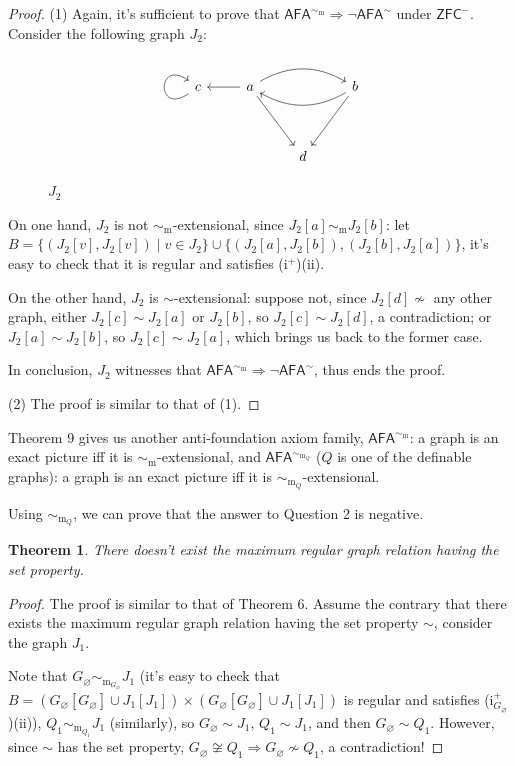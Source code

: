 \documentclass{amsart}
\newcommand{\ZFC}{\mathsf{ZFC}}
\newcommand{\afa}{\mathsf{AFA}}
\newtheorem{theorem}{Theorem}
\begin{document}
\begin{proof}
    (1) Again, it's sufficient to prove that $\afa^{\sim_\mathrm{m}}\Rightarrow\neg\afa^\sim$ under $\ZFC^-$. Consider the following graph $J_2$:
    
\begin{figure}[htbp]
\[\begin{tikzcd}
	{c} & {a} && {b} \\
	\\
	&& {d}
	\arrow[from=1-1, to=1-1, loop, in=145, out=215, distance=10mm]
	\arrow[from=1-2, to=1-1]
	\arrow[bend left, from=1-2, to=1-4]
	\arrow[from=1-2, to=3-3]
	\arrow[bend left, from=1-4, to=1-2]
	\arrow[from=1-4, to=3-3]
\end{tikzcd}\]
\caption{$J_2$}
\end{figure}

    On one hand, $J_2$ is not $\sim_\mathrm{m}$-extensional, since $J_2[a]\sim_\mathrm{m} J_2[b]$: let $B=\{(J_2[v],J_2[v])\mid v\in J_2\}\cup \{(J_2[a],J_2[b]),(J_2[b],J_2[a])\}$, it's easy to check that it is regular and satisfies (i$^+$)(ii).
    
    On the other hand, $J_2$ is $\sim$-extensional:
    suppose not, since $J_2[d]\not\sim$ any other graph, either $J_2[c]\sim J_2[a]$ or $J_2[b]$, so $J_2[c]\sim J_2[d]$, a contradiction;
    or $J_2[a]\sim J_2[b]$, so $J_2[c]\sim J_2[a]$, which brings us back to
the former case.

    In conclusion, $J_2$ witnesses that $\afa^{\sim_\mathrm{m}}\Rightarrow\neg\afa^\sim$, thus ends the proof.

    (2) The proof is similar to that of (1).
\end{proof}

Theorem 9 gives us another anti-foundation axiom family, $\afa^{\sim_\mathrm{m}}$: a graph is an exact picture iff it is $\sim_\mathrm{m}$-extensional, and $\afa^{\sim_{\mathrm{m}_Q}}$ ($Q$ is one of the definable graphs): a graph is an exact picture iff it is $\sim_{\mathrm{m}_Q}$-extensional.

Using $\sim_{\mathrm{m}_Q}$, we can prove that the answer to Question 2 is negative.

\begin{theorem}
    There doesn't exist the maximum regular graph relation having the set property.
\end{theorem}
\begin{proof}
    The proof is similar to that of Theorem 6.
    Assume the contrary that there exists the maximum regular graph relation having the set property $\sim$, consider the graph $J_1$.

    Note that $G_\varnothing \sim_{\mathrm{m}_{G_\varnothing}} J_1$ (it's easy to check that $B=(G_\varnothing[G_\varnothing]\cup J_1[J_1])\times (G_\varnothing[G_\varnothing]\cup J_1[J_1])$ is regular and satisfies (i$_{G_\varnothing}^+$)(ii)), $Q_1\sim_{\mathrm{m}_{Q_1}} J_1$ (similarly), so $G_\varnothing\sim J_1$, $Q_1\sim J_1$, and then $G_\varnothing\sim Q_1$.
    However, since $\sim$ has the set property, $G_\varnothing\not\cong Q_1\Rightarrow G_\varnothing\not\sim Q_1$, a contradiction!
\end{proof}
\end{document}
